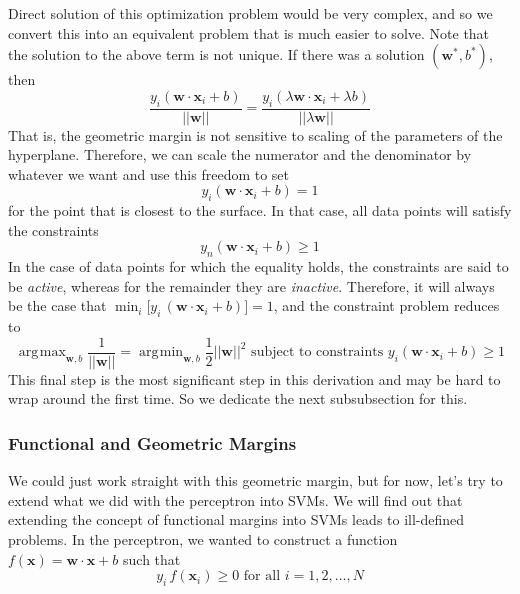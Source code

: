 \documentclass{article}
\DeclareMathOperator*{\argmin}{\arg\!\min}
\DeclareMathOperator*{\argmax}{\arg\!\max}
\theoremstyle{definition}
\theoremstyle{remark}
\theoremstyle{definition}
\begin{document}
Direct solution of this optimization problem would be very complex, and so we convert this into an equivalent problem that is much easier to solve. Note that the solution to the above term is not unique. If there was a solution $(\mathbf{w}^\ast, b^\ast)$, then 
\begin{equation*}
    \frac{y_i (\mathbf{w} \cdot \mathbf{x}_i + b)}{||\mathbf{w}||} = \frac{y_i (\lambda \mathbf{w} \cdot \mathbf{x}_i + \lambda b)}{||\lambda \mathbf{w}||}  
\end{equation*}
That is, the geometric margin is not sensitive to scaling of the parameters of the hyperplane. Therefore, we can scale the numerator and the denominator by whatever we want and use this freedom to set 
\begin{equation*}
    y_i ( \mathbf{w} \cdot \mathbf{x}_i + b ) = 1 
\end{equation*}
for the point that is closest to the surface. In that case, all data points will satisfy the constraints 
\begin{equation*}
    y_n (\mathbf{w} \cdot \mathbf{x}_i + b) \geq 1
\end{equation*}
In the case of data points for which the equality holds, the constraints are said to be \textit{active}, whereas for the remainder they are \textit{inactive}. Therefore, it will always be the case that $\min_i \big[ y_i \, (\mathbf{w} \cdot \mathbf{x}_i + b)\big] = 1$, and the constraint problem reduces to 
\begin{equation*}
    \argmax_{\mathbf{w}, b} \frac{1}{||\mathbf{w}||} = \argmin_{\mathbf{w}, b} \frac{1}{2} ||\mathbf{w}||^2 \text{ subject to constraints } y_i (\mathbf{w} \cdot \mathbf{x}_i + b) \geq 1 
\end{equation*}
This final step is the most significant step in this derivation and may be hard to wrap around the first time. So we dedicate the next subsubsection for this. 


\subsubsection{Functional and Geometric Margins} 


We could just work straight with this geometric margin, but for now, let's try to extend what we did with the perceptron into SVMs. We will find out that extending the concept of functional margins into SVMs leads to ill-defined problems. In the perceptron, we wanted to construct a function $f(\mathbf{x}) = \mathbf{w} \cdot \mathbf{x} + b$ such that 
\begin{equation*}
    y_i \, f(\mathbf{x}_i) \geq 0 \text{ for all } i = 1, 2, \ldots, N
\end{equation*}
\end{document}
